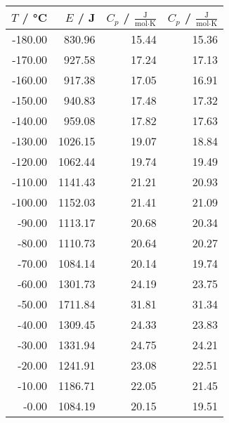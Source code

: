 \begin{tabular}{rrrr}
\toprule
$T$ / °C & $E$ / J & $C_p$ / $\frac{\text{J}}{\text{mol}\cdot\text{K}}$ & $C_p$ / $\frac{\text{J}}{\text{mol}\cdot\text{K}}$ \\
\midrule
-180.00 & 830.96 & 15.44 & 15.36 \\
-170.00 & 927.58 & 17.24 & 17.13 \\
-160.00 & 917.38 & 17.05 & 16.91 \\
-150.00 & 940.83 & 17.48 & 17.32 \\
-140.00 & 959.08 & 17.82 & 17.63 \\
-130.00 & 1026.15 & 19.07 & 18.84 \\
-120.00 & 1062.44 & 19.74 & 19.49 \\
-110.00 & 1141.43 & 21.21 & 20.93 \\
-100.00 & 1152.03 & 21.41 & 21.09 \\
-90.00 & 1113.17 & 20.68 & 20.34 \\
-80.00 & 1110.73 & 20.64 & 20.27 \\
-70.00 & 1084.14 & 20.14 & 19.74 \\
-60.00 & 1301.73 & 24.19 & 23.75 \\
-50.00 & 1711.84 & 31.81 & 31.34 \\
-40.00 & 1309.45 & 24.33 & 23.83 \\
-30.00 & 1331.94 & 24.75 & 24.21 \\
-20.00 & 1241.91 & 23.08 & 22.51 \\
-10.00 & 1186.71 & 22.05 & 21.45 \\
-0.00 & 1084.19 & 20.15 & 19.51 \\
\bottomrule
\end{tabular}
